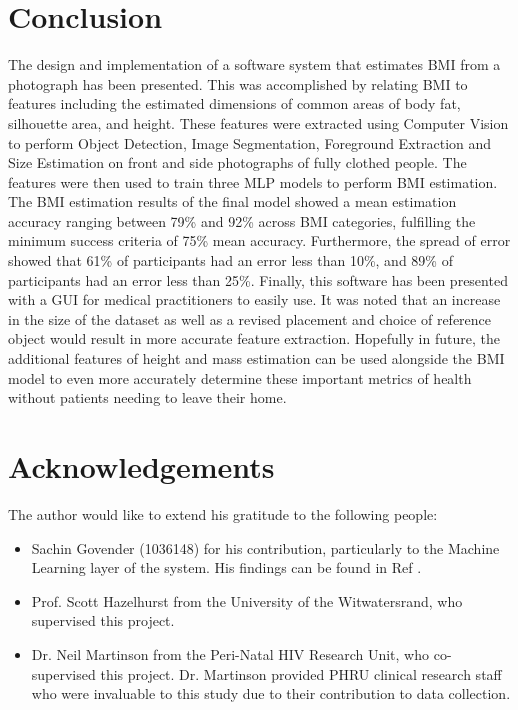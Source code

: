 \documentclass[conference]{IEEEtran}
\begin{document}
\section{Conclusion}
The design and implementation of a software system that estimates BMI from a photograph has been presented.
This was accomplished by relating BMI to features including the estimated dimensions of common areas of body fat, silhouette area, and height.
These features were extracted using Computer Vision to perform Object Detection, Image Segmentation, Foreground Extraction and Size Estimation on front and side photographs of fully clothed people.
The features were then used to train three MLP models to perform BMI estimation.
The BMI estimation results of the final model showed a mean estimation accuracy ranging between 79\% and 92\% across BMI categories, fulfilling the minimum success criteria of 75\% mean accuracy.
Furthermore, the spread of error showed that 61\% of participants had an error less than 10\%, and 89\% of participants had an error less than 25\%.
Finally, this software has been presented with a GUI for medical practitioners to easily use.
It was noted that an increase in the size of the dataset as well as a revised placement and choice of reference object would result in more accurate feature extraction.
Hopefully in future, the additional features of height and mass estimation can be used alongside the BMI model to even more accurately determine these important metrics of health without patients needing to leave their home.

\section{Acknowledgements}
The author would like to extend his gratitude to the following people:
\begin{itemize}
    \item Sachin Govender (1036148) for his contribution, particularly to the Machine Learning layer of the system.
    His findings can be found in Ref \cite{sachin}.
    \item Prof. Scott Hazelhurst from the University of the Witwatersrand, who supervised this project.
    \item Dr. Neil Martinson from the Peri-Natal HIV Research Unit, who co-supervised this project.
    Dr. Martinson provided PHRU clinical research staff who were invaluable to this study due to their contribution to data collection.
\end{itemize}



\end{document}
